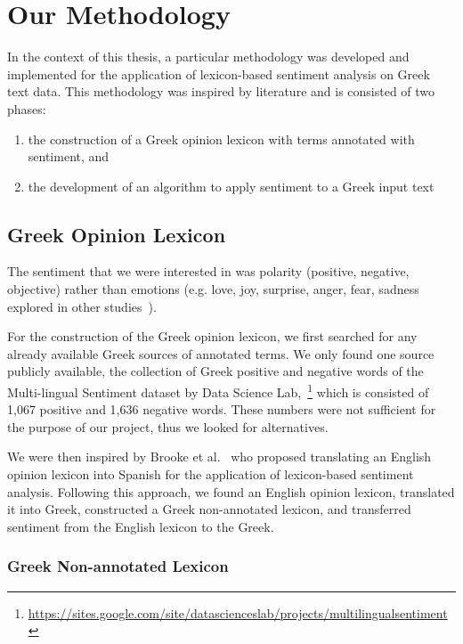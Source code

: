 \section{Our Methodology}
\label{sec:methodology}

In the context of this thesis,
a particular methodology was developed and implemented
for the application of lexicon-based sentiment analysis on Greek text data.
This methodology was inspired by literature and is consisted of two phases:

\begin{enumerate}
 \item the construction of a Greek opinion lexicon
 with terms annotated with sentiment, and
 \item the development of an algorithm to apply sentiment to a Greek input text
\end{enumerate}

\subsection{Greek Opinion Lexicon}
\label{subsec:lexicon}

The sentiment that we were interested in was polarity (positive, negative, objective)
rather than emotions (e.g. love, joy, surprise, anger, fear, sadness
explored in other studies~\cite{CLNQ19}).

For the construction of the Greek opinion lexicon,
we first searched for any already available Greek sources of annotated terms.
We only found one source publicly available,
the collection of Greek positive and negative words
of the Multi-lingual Sentiment dataset
by Data Science Lab,~\footnote{\url{https://sites.google.com/site/datascienceslab/projects/multilingualsentiment}}
which is consisted of 1,067 positive and 1,636 negative words.
These numbers were not sufficient for the purpose of our project,
thus we looked for alternatives.

We were then inspired by Brooke et al.~\cite{BTT09}
who proposed translating an English opinion lexicon into Spanish
for the application of lexicon-based sentiment analysis.
Following this approach,
we found an English opinion lexicon,
translated it into Greek,
constructed a Greek non-annotated lexicon,
and transferred sentiment from the English lexicon to the Greek.

\subsubsection{Greek Non-annotated Lexicon}
\label{subsubsec:greek}

